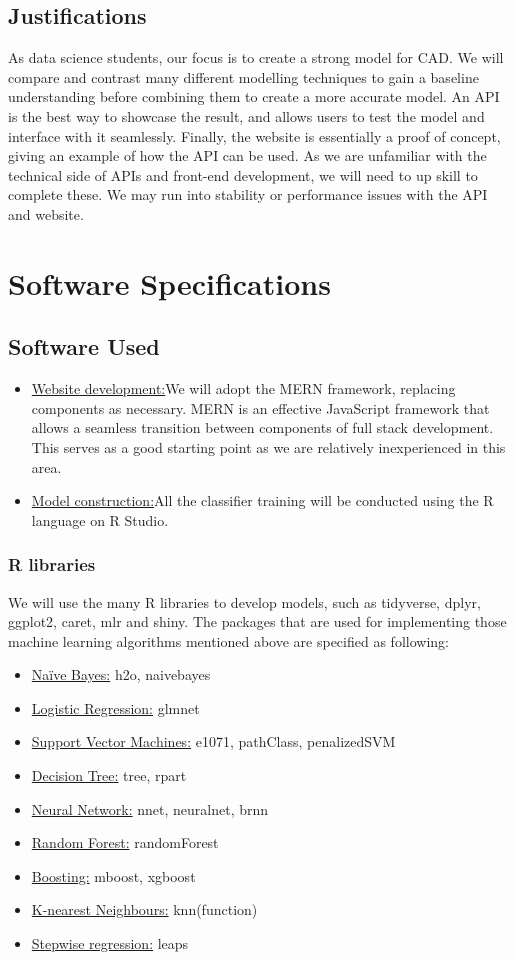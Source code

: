 \documentclass[a4paper, 12pt]{article}
\begin{document}
\subsection{Justifications}
As data science students, our focus is to create a strong model for CAD. We will compare and contrast many different modelling techniques to gain a baseline understanding before combining them to create a more accurate model. An API is the best way to showcase the result, and allows users to test the model and interface with it seamlessly. Finally, the website is essentially a proof of concept, giving an example of how the API can be used. As we are unfamiliar with the technical side of APIs and front-end development, we will need to up skill to complete these. We may run into stability or performance issues with the API and website.

\section{Software Specifications}
\subsection{Software Used}
\begin{itemize}
    \item \underline{Website development:}We will adopt the MERN framework, replacing components as necessary. MERN is an effective JavaScript framework that allows a seamless transition between components of full stack development. This serves as a good starting point as we are relatively inexperienced in this area.
    
    \item \underline{Model construction:}All the classifier training will be conducted using the R language on R Studio.
\end{itemize}
\subsubsection{R libraries}
We will use the many R libraries to develop models, such as tidyverse, dplyr, ggplot2, caret, mlr and shiny. The packages that are used for implementing those machine learning algorithms mentioned above are specified as following:
\begin{itemize}
    \item \underline{Naïve Bayes:} h2o, naivebayes
    \item \underline{Logistic Regression:} glmnet
    \item \underline{Support Vector Machines:} e1071, pathClass, penalizedSVM
    \item \underline{Decision Tree:} tree, rpart
    \item \underline{Neural Network:} nnet, neuralnet, brnn
    \item \underline{Random Forest:} randomForest
    \item \underline{Boosting:} mboost, xgboost
    \item \underline{K-nearest Neighbours:} knn(function)
    \item \underline{Stepwise regression:} leaps
\end{itemize}
\end{document}
